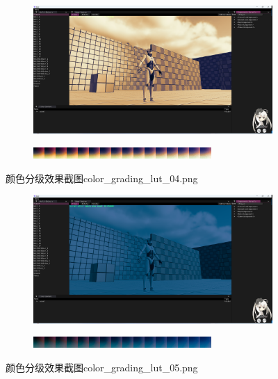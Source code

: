 \documentclass{ctexart}
\begin{document}
    \begin{figure}[!htb]
        \centering
        \begin{subfigure}{1.0\textwidth}
            \includegraphics[width=\textwidth]{screen_shot_color_grading_map_color_grading_lut_04.png}
        \end{subfigure}
        \begin{subfigure}{1.0\textwidth}
            \includegraphics[width=\textwidth]{color_grading_lut_04.png}
        \end{subfigure}      
        \caption{颜色分级效果截图color\_grading\_lut\_04.png}
    \end{figure}  
    \begin{figure}[htbp]
        \centering
        \begin{subfigure}{1.0\textwidth}
            \includegraphics[width=\textwidth]{screen_shot_color_grading_map_color_grading_lut_05.png}
        \end{subfigure}
        \begin{subfigure}{1.0\textwidth}
            \includegraphics[width=\textwidth]{color_grading_lut_05.png}
        \end{subfigure}
        \caption{颜色分级效果截图color\_grading\_lut\_05.png}
    \end{figure}    
\end{document}
